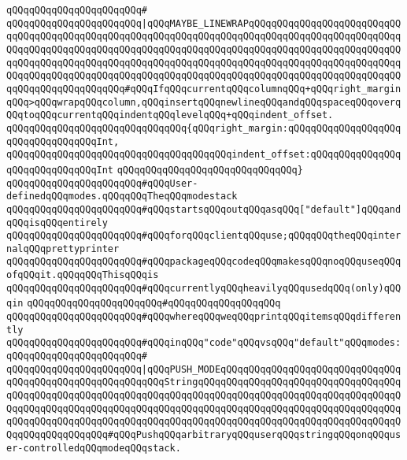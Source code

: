 \verb|qQQqqQQqqQQqqQQqqQQqqQQq#|\newline
\verb|qQQqqQQqqQQqqQQqqQQqqQQq|\verb#|qQQqMAYBE_LINEWRAPqQQqqQQqqQQqqQQqqQQqqQQqqQQqqQQqqQQqqQQqqQQqqQQqqQQqqQQqqQQqqQQqqQQqqQQqqQQqqQQqqQQqqQQqqQQqqQQqqQQqqQQqqQQqqQQqqQQqqQQqqQQqqQQqqQQqqQQqqQQqqQQqqQQqqQQqqQQqqQQqqQQqqQQqqQQqqQQqqQQqqQQqqQQqqQQqqQQqqQQqqQQqqQQqqQQqqQQqqQQqqQQqqQQqqQQqqQQqqQQqqQQqqQQqqQQqqQQqqQQqqQQqqQQqqQQqqQQqqQQqqQQqqQQqqQQqqQQqqQQqqQQqqQQqqQQqqQQqqQQqqQQqqQQq#\verb|#qQQqIfqQQqcurrentqQQqcolumnqQQq+qQQqright_marginqQQq>qQQqwrapqQQqcolumn,qQQqinsertqQQqnewlineqQQqandqQQqspaceqQQqoverqQQqtoqQQqcurrentqQQqindentqQQqlevelqQQq+qQQqindent_offset.|\newline
\verb|qQQqqQQqqQQqqQQqqQQqqQQqqQQqqQQq{qQQqright_margin:qQQqqQQqqQQqqQQqqQQqqQQqqQQqqQQqqQQqInt,|\newline
\verb|qQQqqQQqqQQqqQQqqQQqqQQqqQQqqQQqqQQqqQQqindent_offset:qQQqqQQqqQQqqQQqqQQqqQQqqQQqqQQqInt|\newline
\verb|qQQqqQQqqQQqqQQqqQQqqQQqqQQqqQQq}|\newline
\newline
\verb|qQQqqQQqqQQqqQQqqQQqqQQq#qQQqUser-definedqQQqmodes.qQQqqQQqTheqQQqmodestack|\newline
\verb|qQQqqQQqqQQqqQQqqQQqqQQq#qQQqstartsqQQqoutqQQqasqQQq["default"]qQQqandqQQqisqQQqentirely|\newline
\verb|qQQqqQQqqQQqqQQqqQQqqQQq#qQQqforqQQqclientqQQquse;qQQqqQQqtheqQQqinternalqQQqprettyprinter|\newline
\verb|qQQqqQQqqQQqqQQqqQQqqQQq#qQQqpackageqQQqcodeqQQqmakesqQQqnoqQQquseqQQqofqQQqit.qQQqqQQqThisqQQqis|\newline
\verb|qQQqqQQqqQQqqQQqqQQqqQQq#qQQqcurrentlyqQQqheavilyqQQqusedqQQq(only)qQQqin|\newline
\verb|qQQqqQQqqQQqqQQqqQQqqQQq#qQQqqQQqqQQqqQQqqQQq|\newline
\verb|qQQqqQQqqQQqqQQqqQQqqQQq#qQQqwhereqQQqweqQQqprintqQQqitemsqQQqdifferently|\newline
\verb|qQQqqQQqqQQqqQQqqQQqqQQq#qQQqinqQQq"code"qQQqvsqQQq"default"qQQqmodes:|\newline
\verb|qQQqqQQqqQQqqQQqqQQqqQQq#|\newline
\verb|qQQqqQQqqQQqqQQqqQQqqQQq|\verb#|qQQqPUSH_MODEqQQqqQQqqQQqqQQqqQQqqQQqqQQqqQQqqQQqqQQqqQQqqQQqqQQqqQQqqQQqStringqQQqqQQqqQQqqQQqqQQqqQQqqQQqqQQqqQQqqQQqqQQqqQQqqQQqqQQqqQQqqQQqqQQqqQQqqQQqqQQqqQQqqQQqqQQqqQQqqQQqqQQqqQQqqQQqqQQqqQQqqQQqqQQqqQQqqQQqqQQqqQQqqQQqqQQqqQQqqQQqqQQqqQQqqQQqqQQqqQQqqQQqqQQqqQQqqQQqqQQqqQQqqQQqqQQqqQQqqQQqqQQqqQQqqQQqqQQqqQQqqQQqqQQqqQQqqQQqqQQqqQQq#\verb|#qQQqPushqQQqarbitraryqQQquserqQQqstringqQQqonqQQquser-controlledqQQqmodeqQQqstack.|\newline
